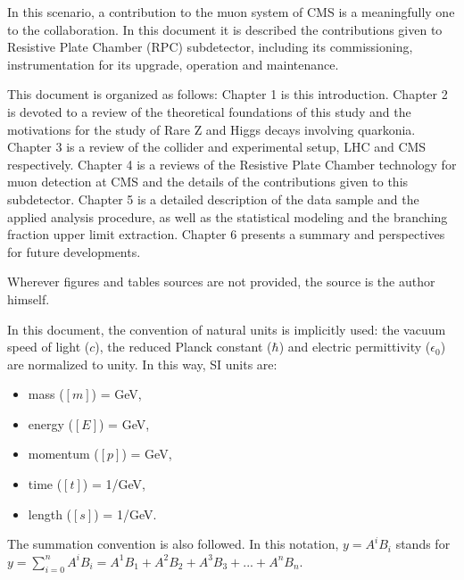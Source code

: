 In this scenario, a contribution to the muon system of CMS is a meaningfully one to the collaboration. In this document it is described the contributions given to Resistive Plate Chamber (RPC) subdetector, including its commissioning, instrumentation for its upgrade, operation and maintenance.

This document is organized as follows: Chapter 1 is this introduction. Chapter 2 is devoted to a review of the theoretical foundations of this study and the motivations for the study of Rare Z and Higgs decays involving quarkonia. Chapter 3 is a review of the collider and experimental setup, LHC and CMS respectively. Chapter 4 is a reviews of the Resistive Plate Chamber technology for muon detection at CMS and the details of the contributions given to this subdetector. Chapter 5 is a detailed description of the data sample and the applied analysis procedure, as well as the statistical modeling and the branching fraction upper limit extraction. Chapter 6 presents a summary and perspectives for future developments.

Wherever figures and tables sources are not provided, the source is the author himself.

In this document, the convention of natural units is implicitly used: the vacuum speed of light ($c$), the reduced Planck constant ($\hbar$) and electric permittivity ($\epsilon_{0}$) are normalized to unity. In this way, SI units are:
\begin{itemize}
    \setlength\itemsep{-0.5em}
    \item mass ($[m]$) = GeV,
    \item energy ($[E]$) = GeV,
    \item momentum ($[p]$) = GeV,
    \item time ($[t]$) = 1/GeV,
    \item length ($[s]$) = 1/GeV.
\end{itemize}

The summation convention is also followed. In this notation, $y = A^i B_i$ stands for $y = \sum_{i=0}^n A^i B_i = A^1 B_1 + A^2 B_2 + A^3 B_3 + ... + A^n B_n$.
